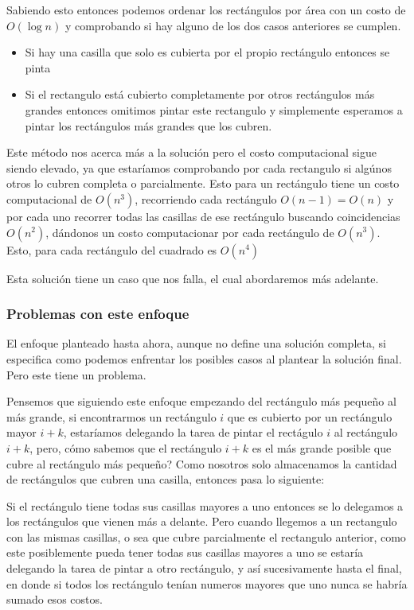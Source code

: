 \documentclass{article}
\begin{document}
Sabiendo esto entonces podemos ordenar los rectángulos por área con un costo de $O(\log n)$ y comprobando si hay alguno de los dos casos anteriores se cumplen.

\begin{itemize}

\item Si hay una casilla que solo es cubierta por el propio rectángulo entonces se pinta
\item Si el rectangulo está cubierto completamente por otros rectángulos más grandes entonces omitimos pintar este rectangulo y simplemente esperamos a pintar los rectángulos más grandes que los cubren.

\end{itemize}
Este método nos acerca más a la solución pero el costo computacional sigue siendo elevado, ya que estaríamos comprobando por cada rectangulo si algúnos otros lo cubren completa o parcialmente. Esto para un rectángulo tiene un costo computacional de $O(n^3)$, recorriendo cada rectángulo $O(n-1) = O(n)$ y por cada uno recorrer todas las casillas de ese rectángulo buscando coincidencias $O(n^2)$, dándonos un costo computacionar por cada rectángulo de $O(n^3)$. Esto, para cada rectángulo del cuadrado es $O(n^4)$

Esta solución tiene un caso que nos falla, el cual abordaremos más adelante.
	\subsubsection{Problemas con este enfoque}
	
	El enfoque planteado hasta ahora, aunque no define una solución completa, si especifica como podemos enfrentar los posibles casos al plantear la solución final. Pero este tiene un problema.

Pensemos que siguiendo este enfoque empezando del rectángulo más pequeño al más grande, si encontrarmos un rectángulo $i$ que es cubierto por un rectángulo mayor $i + k$, estaríamos delegando la tarea de pintar el rectágulo $i$ al rectángulo $i + k$, pero, cómo sabemos que el rectángulo $i + k$ es el más grande posible que cubre al rectángulo más pequeño? Como nosotros solo almacenamos la cantidad de rectángulos que cubren una casilla, entonces pasa lo siguiente:

Si el rectángulo tiene todas sus casillas mayores a uno entonces se lo delegamos a los rectángulos que vienen más a delante. Pero cuando llegemos a un rectangulo con las mismas casillas, o sea que cubre parcialmente el rectangulo anterior, como este posiblemente pueda tener todas sus casillas mayores a uno se estaría delegando la tarea de pintar a otro rectángulo, y así sucesivamente hasta el final, en donde si todos los rectángulo tenían numeros mayores que uno nunca se habría sumado esos costos.
\end{document}
